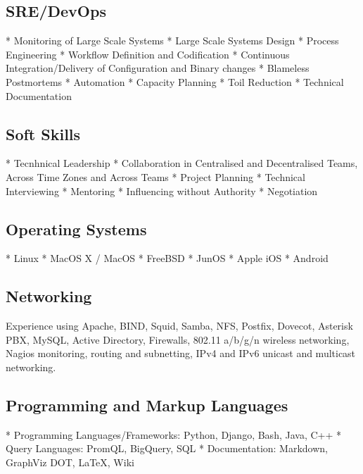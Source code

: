 \documentclass[a4paper, 11pt] {article}
\begin{document}
\subsection*{SRE/DevOps}

* Monitoring of Large Scale Systems
* Large Scale Systems Design
* Process Engineering
* Workflow Definition and Codification
* Continuous Integration/Delivery of Configuration and Binary changes
* Blameless Postmortems
* Automation
* Capacity Planning
* Toil Reduction
* Technical Documentation

\subsection*{Soft Skills}

* Tecnhnical Leadership
* Collaboration in Centralised and Decentralised Teams, Across Time Zones and Across Teams
* Project Planning
* Technical Interviewing
* Mentoring
* Influencing without Authority
* Negotiation

\subsection*{Operating Systems}

* Linux
* MacOS X / MacOS
* FreeBSD
* JunOS
* Apple iOS
* Android

\subsection*{Networking}


Experience using Apache, BIND, Squid, Samba, NFS, Postfix, Dovecot,
Asterisk PBX, MySQL, Active  Directory, Firewalls, 802.11 a/b/g/n wireless 
networking, Nagios monitoring, routing and subnetting, IPv4 and IPv6 
unicast and multicast networking.

\subsection*{Programming and Markup Languages}

* Programming Languages/Frameworks: Python, Django, Bash, Java, C++
* Query Languages: PromQL, BigQuery, SQL
* Documentation: Markdown, GraphViz DOT, LaTeX, Wiki
\end{document}

